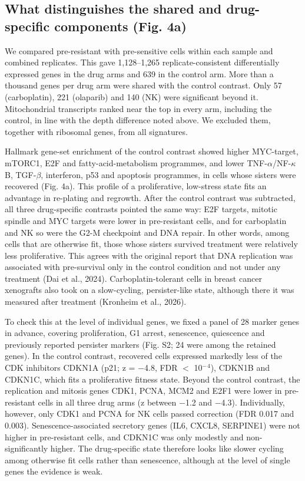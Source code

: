 \documentclass[11pt,a4paper]{article}
\begin{document}
\subsection*{What distinguishes the shared and drug-specific components (Fig. 4a)}

We compared pre-resistant with pre-sensitive cells within each sample and combined replicates. This gave 1,128--1,265 replicate-consistent differentially expressed genes in the drug arms and 639 in the control arm. More than a thousand genes per drug arm were shared with the control contrast. Only 57 (carboplatin), 221 (olaparib) and 140 (NK) were significant beyond it. Mitochondrial transcripts ranked near the top in every arm, including the control, in line with the depth difference noted above. We excluded them, together with ribosomal genes, from all signatures.

Hallmark gene-set enrichment of the control contrast showed higher MYC-target, mTORC1, E2F and fatty-acid-metabolism programmes, and lower TNF-$\alpha$/NF-$\kappa$B, TGF-$\beta$, interferon, p53 and apoptosis programmes, in cells whose sisters were recovered (Fig. 4a). This profile of a proliferative, low-stress state fits an advantage in re-plating and regrowth. After the control contrast was subtracted, all three drug-specific contrasts pointed the same way: E2F targets, mitotic spindle and MYC targets were lower in pre-resistant cells, and for carboplatin and NK so were the G2-M checkpoint and DNA repair. In other words, among cells that are otherwise fit, those whose sisters survived treatment were relatively less proliferative. This agrees with the original report that DNA replication was associated with pre-survival only in the control condition and not under any treatment (Dai et al., 2024). Carboplatin-tolerant cells in breast cancer xenografts also took on a slow-cycling, persister-like state, although there it was measured after treatment (Kronheim et al., 2026).

To check this at the level of individual genes, we fixed a panel of 28 marker genes in advance, covering proliferation, G1 arrest, senescence, quiescence and previously reported persister markers (Fig. S2; 24 were among the retained genes). In the control contrast, recovered cells expressed markedly less of the CDK inhibitors CDKN1A (p21; z = $-$4.8, FDR $<$ 10$^-$$^4$), CDKN1B and CDKN1C, which fits a proliferative fitness state. Beyond the control contrast, the replication and mitosis genes CDK1, PCNA, MCM2 and E2F1 were lower in pre-resistant cells in all three drug arms (z between $-$1.2 and $-$4.3). Individually, however, only CDK1 and PCNA for NK cells passed correction (FDR 0.017 and 0.003). Senescence-associated secretory genes (IL6, CXCL8, SERPINE1) were not higher in pre-resistant cells, and CDKN1C was only modestly and non-significantly higher. The drug-specific state therefore looks like slower cycling among otherwise fit cells rather than senescence, although at the level of single genes the evidence is weak.
\end{document}
